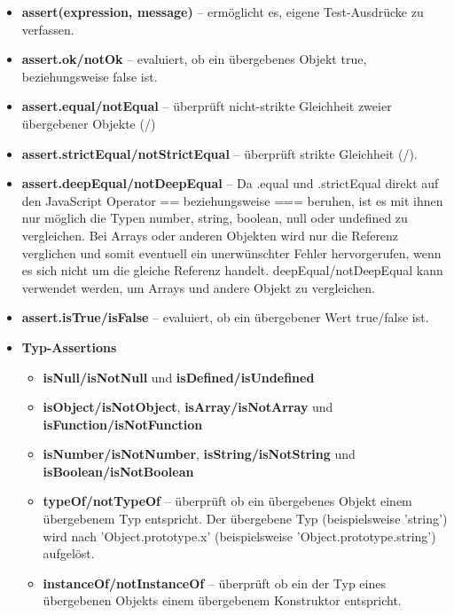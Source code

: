\begin{itemize}
  \item \textbf{assert(expression, message)} -- ermöglicht es, eigene Test-Ausdrücke zu verfassen.

  \item \textbf{assert.ok/notOk} -- evaluiert, ob ein übergebenes Objekt true, beziehungsweise false ist.
  
  \item \textbf{assert.equal/notEqual} -- überprüft nicht-strikte Gleichheit zweier übergebener Objekte (\glqq{==\grqq}/\glqq{!=\grqq})
  
  \item \textbf{assert.strictEqual/notStrictEqual} -- überprüft strikte Gleichheit (\glqq{===\grqq}/\glqq{!==\grqq}).
  
  \item \textbf{assert.deepEqual/notDeepEqual} -- Da .equal und .strictEqual direkt auf den JavaScript Operator == beziehungsweise === beruhen, ist es mit ihnen nur möglich die Typen number, string, boolean, null oder undefined zu vergleichen. Bei Arrays oder anderen Objekten wird nur die Referenz verglichen und somit eventuell ein unerwünschter Fehler hervorgerufen, wenn es sich nicht um die gleiche Referenz handelt. deepEqual/notDeepEqual kann verwendet werden, um Arrays und andere Objekt zu vergleichen.
  
  \item \textbf{assert.isTrue/isFalse} -- evaluiert, ob ein übergebener Wert true/false ist.
  
  \item \textbf{Typ-Assertions}
  \begin{itemize}
    \item \textbf{isNull/isNotNull} und \textbf{isDefined/isUndefined}
    \item \textbf{isObject/isNotObject}, \textbf{isArray/isNotArray} und \textbf{isFunction/isNotFunction}
    \item \textbf{isNumber/isNotNumber}, \textbf{isString/isNotString} und \textbf{isBoolean/isNotBoolean}
    \item \textbf{typeOf/notTypeOf} -- überprüft ob ein übergebenes Objekt einem übergebenem Typ entspricht. Der übergebene Typ (beispielsweise 'string') wird nach 'Object.prototype.x' (beispielsweise 'Object.prototype.string') aufgelöst.
    \item \textbf{instanceOf/notInstanceOf} -- überprüft ob ein der Typ eines übergebenen Objekts einem übergebenem Konstruktor entspricht.
  \end{itemize}
  

\end{itemize}
